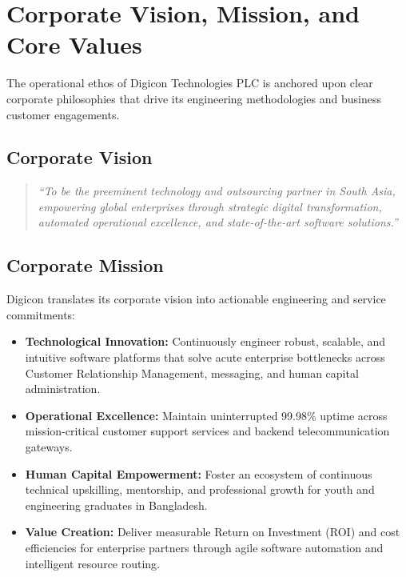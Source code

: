 \section{Corporate Vision, Mission, and Core Values}
\label{sec:org_vision_mission}

The operational ethos of Digicon Technologies PLC is anchored upon clear corporate philosophies that drive its engineering methodologies and business customer engagements.

\subsection{Corporate Vision}
\begin{quote}
    \textit{“To be the preeminent technology and outsourcing partner in South Asia, empowering global enterprises through strategic digital transformation, automated operational excellence, and state-of-the-art software solutions.”}
\end{quote}

\subsection{Corporate Mission}
Digicon translates its corporate vision into actionable engineering and service commitments:
\begin{itemize}
    \item \textbf{Technological Innovation:} Continuously engineer robust, scalable, and intuitive software platforms that solve acute enterprise bottlenecks across Customer Relationship Management, messaging, and human capital administration.
    \item \textbf{Operational Excellence:} Maintain uninterrupted 99.98\% uptime across mission-critical customer support services and backend telecommunication gateways.
    \item \textbf{Human Capital Empowerment:} Foster an ecosystem of continuous technical upskilling, mentorship, and professional growth for youth and engineering graduates in Bangladesh.
    \item \textbf{Value Creation:} Deliver measurable Return on Investment (ROI) and cost efficiencies for enterprise partners through agile software automation and intelligent resource routing.
\end{itemize}

